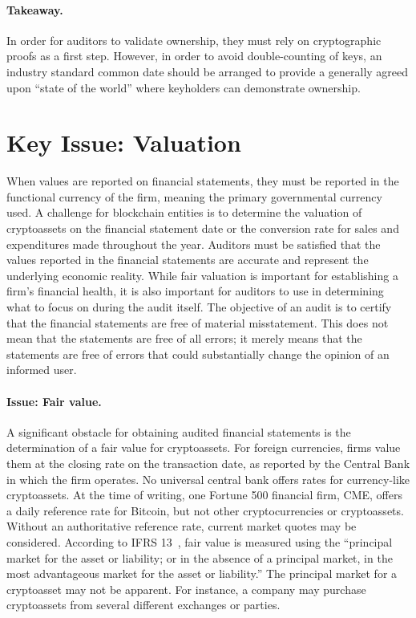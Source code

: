 \paragraph{Takeaway.} In order for auditors to validate ownership, they must rely on cryptographic proofs as a first step. However, in order to avoid double-counting of keys, an industry standard common date should be arranged to provide a generally agreed upon ``state of the world'' where keyholders can demonstrate ownership. 

\section{Key Issue: Valuation}
When values are reported on financial statements, they must be reported in the functional currency of the firm, meaning the primary governmental currency used. A challenge for blockchain entities is to determine the valuation of cryptoassets on the financial statement date or the conversion rate for sales and expenditures made throughout the year. Auditors must be satisfied that the values reported in the financial statements are accurate and represent the underlying economic reality. While fair valuation is important for establishing a firm{'}s financial health, it is also important for auditors to use in determining what to focus on during the audit itself. The objective of an audit is to certify that the financial statements are free of material misstatement. This does not mean that the statements are free of all errors; it merely means that the statements are free of errors that could substantially change the opinion of an informed user. 

\paragraph{Issue: Fair value.} A significant obstacle for obtaining audited financial statements is the determination of a fair value for cryptoassets. For foreign currencies, firms value them at the closing rate on the transaction date, as reported by the Central Bank in which the firm operates. No universal central bank offers rates for currency-like cryptoassets. At the time of writing, one Fortune 500 financial firm, CME, offers a daily reference rate for Bitcoin, but not other cryptocurrencies or cryptoassets. Without an authoritative reference rate, current market quotes may be considered. According to IFRS 13~\cite{ifrs201113}, fair value is measured using the ``principal market for the asset or liability; or in the absence of a principal market, in the most advantageous market for the asset or liability.'' The principal market for a cryptoasset may not be apparent. For instance, a company may purchase cryptoassets from several different exchanges or parties. 

